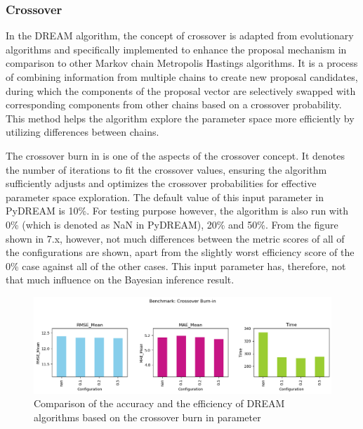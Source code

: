 \subsubsection{Crossover}
In the DREAM algorithm, the concept of crossover is adapted from evolutionary algorithms and specifically implemented to enhance the proposal mechanism in comparison to other Markov chain Metropolis Hastings algorithms. It is a process of combining information from multiple chains to create new proposal candidates, during which the components of the proposal vector are selectively swapped with corresponding components from other chains based on a crossover probability.\cite{dream} This method helps the algorithm explore the parameter space more efficiently by utilizing differences between chains.

The crossover burn in is one of the aspects of the crossover concept. It denotes the number of iterations to fit the crossover values, ensuring the algorithm sufficiently adjusts and optimizes the crossover probabilities for effective parameter space exploration. The default value of this input parameter in PyDREAM is 10\%. For testing purpose however, the algorithm is also run with 0\% (which is denoted as NaN in PyDREAM), 20\% and 50\%. From the figure shown in 7.x, however, not much differences between the metric scores of all of the configurations are shown, apart from the slightly worst efficiency score of the 0\% case against all of the other cases. This input parameter has, therefore, not that much influence on the Bayesian inference result.
\begin{figure}[H]
    \centering
    \includegraphics[width=1\textwidth]{figures/dream/crossover_burn_in.png}
    \captionsetup{width=.8\textwidth}
    \caption{Comparison of the accuracy and the efficiency of DREAM algorithms based on the crossover burn in parameter}
    \label{fig:enter-label}
\end{figure}

